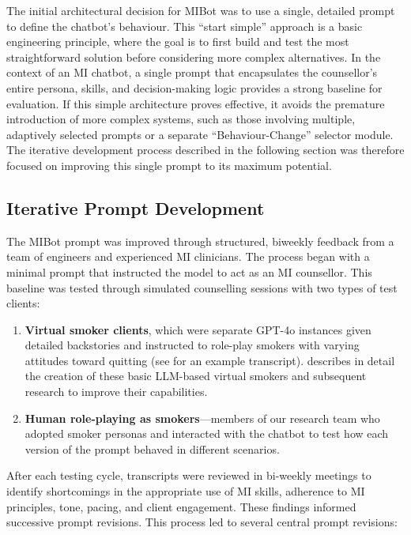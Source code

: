 The initial architectural decision for MIBot was to use a single, detailed prompt to define the chatbot's behaviour. This ``start simple'' approach is a basic engineering principle, where the goal is to first build and test the most straightforward solution before considering more complex alternatives. In the context of an MI chatbot, a single prompt that encapsulates the counsellor's entire persona, skills, and decision-making logic provides a strong baseline for evaluation. If this simple architecture proves effective, it avoids the premature introduction of more complex systems, such as those involving multiple, adaptively selected prompts or a separate ``Behaviour-Change'' selector module. The iterative development process described in the following section was therefore focused on improving this single prompt to its maximum potential.

\subsection{Iterative Prompt Development}
The MIBot prompt was improved through structured, biweekly feedback from a team of engineers and experienced MI clinicians. The process began with a minimal prompt that instructed the model to act as an MI counsellor. This baseline was tested through simulated counselling sessions with two types of test clients:

\begin{enumerate}
	\item \textbf{Virtual smoker clients}, which were separate GPT-4o instances given detailed backstories and instructed to role-play smokers with varying attitudes toward quitting (see  for an example transcript).  describes in detail the creation of these basic LLM-based virtual smokers and subsequent research to improve their capabilities.
	\item \textbf{Human role-playing as smokers}---members of our research team who adopted smoker personas and interacted with the chatbot to test how each version of the prompt behaved in different scenarios.
\end{enumerate}

After each testing cycle, transcripts were reviewed in bi-weekly meetings to identify shortcomings in the appropriate use of MI skills, adherence to MI principles, tone, pacing, and client engagement. These findings informed successive prompt revisions.
This process led to several central prompt revisions:



